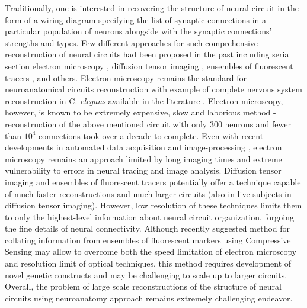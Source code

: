 \documentclass[amsmath,amssymb]{revtex4}
\begin{document}
Traditionally, one is interested in recovering the structure of neural circuit in the form of a wiring diagram specifying the list of synaptic connections in a particular population of neurons alongside with the synaptic connections' strengths and types.
Few different approaches for such comprehensive reconstruction of neural circuits had been proposed in the past including serial section electron microscopy \cite{Briggman2006,Helmstaedter2009}, diffusion tensor imaging \cite{Hagmann2007,Hagmann2008}, ensembles of fluorescent tracers \cite{Bohland2009}, and others.
Electron microscopy remains the standard for neuroanatomical circuits reconstruction with example of complete nervous system reconstruction in C. {\em elegans} available in the literature \cite{White1986,rswormatlas}.
Electron microscopy, however, is known to be extremely expensive, slow and laborious method - reconstruction of the above mentioned circuit with only 300 neurons and fewer than $10^4$ connections took over a decade to complete.
Even with recent developments in automated data acquisition \cite{DenkHorstmann04} and image-processing \cite{Mishchenko2009c,Jain2007,Jurrus2006}, electron microscopy remains an approach limited by long imaging times and extreme vulnerability to errors in neural tracing and image analysis.
Diffusion tensor imaging \cite{Hagmann2007} and ensembles of fluorescent tracers \cite{Bohland2009} potentially offer a technique capable of much faster reconstructions and much larger circuits (also in live subjects in diffusion tensor imaging). However, low resolution of these techniques limits them to only the highest-level information about neural circuit organization, forgoing the fine details of neural connectivity.
Although recently suggested method for collating information from ensembles of fluorescent markers using Compressive Sensing \cite{Mishchenko2009a,Mishchenko2009} may allow to overcome both the speed limitation of electron microscopy and resolution limit of optical techniques, this method requires development of novel genetic constructs and may be challenging to scale up to larger circuits.
Overall, the problem of large scale reconstructions of the structure of neural circuits using neuroanatomy approach remains extremely challenging endeavor.
\end{document}
